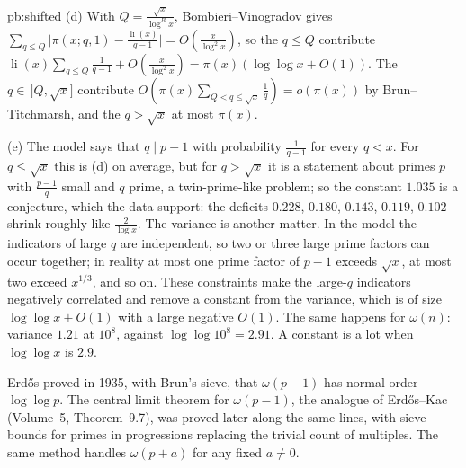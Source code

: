 \begin{solution}{pb:shifted}
(d) With $Q=\frac{\sqrt x}{\log^Bx}$, Bombieri--Vinogradov gives $\sum_{q\le Q}\bigl|\pi(x;q,1)-\frac{\operatorname{li}(x)}{q-1}\bigr|=O(\frac x{\log^2x})$, so the $q\le Q$ contribute
$\operatorname{li}(x)\sum_{q\le Q}\frac1{q-1}+O(\frac x{\log^2x})=\pi(x)(\log\log x+O(1))$. The $q\in\,]Q,\sqrt x]$ contribute $O(\pi(x)\sum_{Q<q\le\sqrt x}\frac1q)=o(\pi(x))$ by Brun--Titchmarsh, and the
$q>\sqrt x$ at most $\pi(x)$.

(e) The model says that $q\mid p-1$ with probability $\frac1{q-1}$ for every $q<x$. For $q\le\sqrt x$ this is (d) on average, but for $q>\sqrt x$ it is a statement about primes $p$
with $\frac{p-1}q$ small and $q$ prime, a twin-prime-like problem; so the constant $1.035$ is a conjecture, which the data support: the deficits $0.228$, $0.180$, $0.143$, $0.119$,
$0.102$ shrink roughly like $\frac2{\log x}$. The variance is another matter. In the model the indicators of large $q$ are independent, so two or three large prime factors can
occur together; in reality at most one prime factor of $p-1$ exceeds $\sqrt x$, at most two exceed $x^{1/3}$, and so on. These constraints make the large-$q$ indicators negatively
correlated and remove a constant from the variance, which is of size $\log\log x+O(1)$ with a large negative $O(1)$. The same happens for $\omega(n)$: variance $1.21$ at $10^8$,
against $\log\log10^8=2.91$. A constant is a lot when $\log\log x$ is $2.9$.


\leads Erd\H os proved in 1935, with Brun's sieve, that $\omega(p-1)$ has normal order $\log\log p$. The central limit theorem for $\omega(p-1)$, the analogue of Erd\H os--Kac
(Volume~5, Theorem~9.7), was proved later along the same lines, with sieve bounds for primes in progressions replacing the trivial count of multiples. The same method handles $\omega(p+a)$ for any fixed $a\ne0$.
\end{solution}

